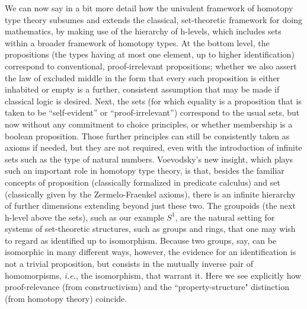\documentclass[11pt]{article}
\theoremstyle{remark}
\theoremstyle{definition}
\begin{document}
We can now say in a bit more detail how the univalent framework of homotopy type theory subsumes and extends the
classical, set-theoretic framework for doing mathematics, by making use of the hierarchy of h-levels, which includes
sets within a broader framework of homotopy types.  At the bottom level, the propositions (the types having at most one
element, up to higher identification) correspond to conventional, proof-irrelevant propositions; whether we also assert
the law of excluded middle in the form that every such proposition is either inhabited or empty is a further, consistent
assumption that may be made if classical logic is desired.  Next, the sets (for which equality is a proposition that is
taken to be ``self-evident'' or ``proof-irrelevant'') correspond to the usual sets, but now without any commitment to
choice principles, or whether membership is a boolean proposition.  Those further principles can still be consistently
taken as axioms if needed, but they are not required, even with the introduction of infinite sets such as the type of
natural numbers. Voevodsky's new insight, which plays such an important role in homotopy type theory, is that, besides
the familiar concepts of proposition (classically formalized in predicate calculus) and set (classically given by the
Zermelo-Fraenkel axioms), there is an infinite hierarchy of further dimensions extending beyond just these two.  The
groupoids (the next h-level above the sets), such as our example $S^1$, are the natural setting for systems of
set-theoretic structures, such as groups and rings, that one may wish to regard as identified up to isomorphism.
Because two groups, say, can be isomorphic in many different ways, however, the evidence for an identification is not a
trivial proposition, but consists in the mutually inverse pair of homomorpisms, \textit{i.e.}, the isomorphism, that
warrant it.  Here we see explicitly how proof-relevance (from constructivism) and the ``property-structure" distinction (from homotopy theory) coincide.
\end{document}
